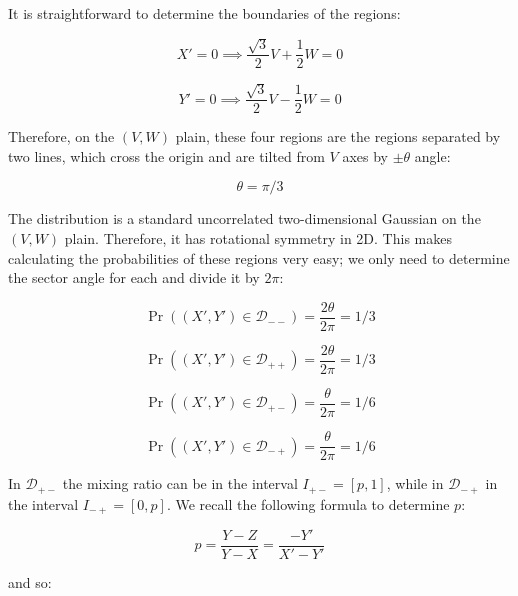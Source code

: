 \documentclass{article}
\theoremstyle{definition}
\begin{document}
\begin{appendices}
It is straightforward to determine the boundaries of the regions:

\begin{equation}
    X' = 0 \implies \frac{\sqrt{3}}{2} V + \frac{1}{2} W = 0
\end{equation}

\begin{equation}
    Y' = 0 \implies \frac{\sqrt{3}}{2} V - \frac{1}{2} W = 0
\end{equation}

Therefore, on the $(V, W)$ plain, these four regions are the regions separated by two lines, which cross the origin and are tilted from $V$ axes by $\pm \theta$ angle:

\begin{equation}
    \theta = \pi/3
\end{equation}

The distribution is a standard uncorrelated two-dimensional Gaussian on the $(V, W)$ plain. Therefore, it has rotational symmetry in 2D.
This makes calculating the probabilities of these regions very easy; we only need to determine the sector angle for each and divide it by $2 \pi$:


\begin{equation}
    \Pr((X',Y') \in \mathcal{D}_{--}) = \frac{2 \theta}{2 \pi} = 1/3
\end{equation}

\begin{equation}
    \Pr((X',Y') \in \mathcal{D}_{++}) = \frac{2 \theta}{2 \pi} = 1/3
\end{equation}

\begin{equation}
    \Pr((X',Y') \in \mathcal{D}_{+-}) = \frac{\theta}{2 \pi} = 1/6
\end{equation}

\begin{equation}
    \Pr((X',Y') \in \mathcal{D}_{-+}) = \frac{\theta}{2 \pi} = 1/6
\end{equation}

In $\mathcal{D}_{+-}$ the mixing ratio can be in the interval $I_{+-} = [p,1]$, while in $\mathcal{D}_{-+}$ in the interval $I_{-+} = [0,p]$.
We recall the following formula to determine $p$:

\begin{equation}
    p = \frac{Y-Z}{Y-X} = \frac{-Y'}{X'-Y'}
\end{equation}

and so:


\end{appendices}
\end{document}
